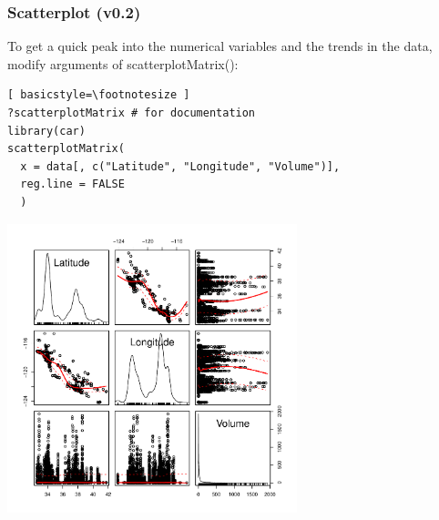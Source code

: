 \begin{frame}
\frametitle{Scatterplot (v0.2)}

To get a quick peak into the numerical variables and the trends in the data, modify arguments of \ttfamily scatterplotMatrix(): \normalfont
  		\begin{lstlisting}[ basicstyle=\footnotesize ]
?scatterplotMatrix # for documentation
library(car)		
scatterplotMatrix(
  x = data[, c("Latitude", "Longitude", "Volume")], 
  reg.line = FALSE
  )
		\end{lstlisting}

        \begin{center}
         \includegraphics[width=0.63\textwidth]{images/scatterPlot_v1.pdf}
        \end{center}
\end{frame}

